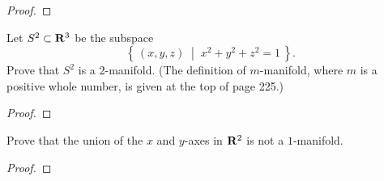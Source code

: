\begin{proof}
\end{proof}
\newpage
\begin{problem}[(C)]
Let $S^2\subset\mathbf{R}^3$ be the subspace
\[
\left\{\,(x,y,z)\;\middle|\; x^2+y^2+z^2=1\,\right\}.
\]
Prove that $S^2$ is a $2$-manifold. (The definition of
$m$-manifold, where $m$ is a positive whole number, is given at
the top of page 225.)
\end{problem}
\begin{proof}
\end{proof}
\newpage
\begin{problem}[(D)]
Prove that the union of the $x$ and $y$-axes in $\mathbf{R}^2$ is not a
$1$-manifold.
\end{problem}
\begin{proof}
\end{proof}

